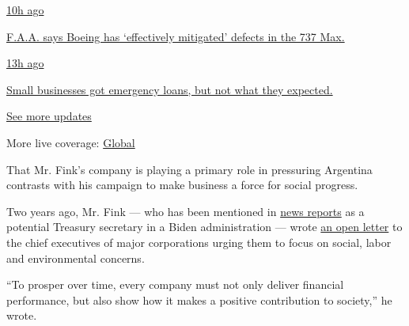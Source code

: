 \href{https://www.nytimes.com/live/2020/08/03/business/stock-market-today-coronavirus?action=click\&pgtype=Article\&state=default\&region=MAIN_CONTENT_1\&context=storylines_live_updates\#faa-says-boeing-has-effectively-mitigated-defects-in-the-737-max}{10h
ago}

\href{https://www.nytimes.com/live/2020/08/03/business/stock-market-today-coronavirus?action=click\&pgtype=Article\&state=default\&region=MAIN_CONTENT_1\&context=storylines_live_updates\#faa-says-boeing-has-effectively-mitigated-defects-in-the-737-max}{F.A.A.
says Boeing has `effectively mitigated' defects in the 737 Max.}

\href{https://www.nytimes.com/live/2020/08/03/business/stock-market-today-coronavirus?action=click\&pgtype=Article\&state=default\&region=MAIN_CONTENT_1\&context=storylines_live_updates\#small-businesses-got-emergency-loans-but-not-what-they-expected}{13h
ago}

\href{https://www.nytimes.com/live/2020/08/03/business/stock-market-today-coronavirus?action=click\&pgtype=Article\&state=default\&region=MAIN_CONTENT_1\&context=storylines_live_updates\#small-businesses-got-emergency-loans-but-not-what-they-expected}{Small
businesses got emergency loans, but not what they expected.}

\href{https://www.nytimes.com/live/2020/08/03/business/stock-market-today-coronavirus?action=click\&pgtype=Article\&state=default\&region=MAIN_CONTENT_1\&context=storylines_live_updates}{See
more updates}

More live coverage:
\href{https://www.nytimes.com/2020/08/03/world/coronavirus-covid-19.html?action=click\&pgtype=Article\&state=default\&region=MAIN_CONTENT_1\&context=storylines_live_updates}{Global}

That Mr. Fink's company is playing a primary role in pressuring
Argentina contrasts with his campaign to make business a force for
social progress.

Two years ago, Mr. Fink --- who has been mentioned in
\href{https://www.cnbc.com/2020/04/06/biden-donors-float-elizabeth-warren-larry-fink-others-for-key-roles.html}{news
reports} as a potential Treasury secretary in a Biden administration ---
wrote
\href{http://www.corporance.es/wp-content/uploads/2018/01/Larry-Fink-letter-to-CEOs-2018-1.pdf}{an
open letter} to the chief executives of major corporations urging them
to focus on social, labor and environmental concerns.

``To prosper over time, every company must not only deliver financial
performance, but also show how it makes a positive contribution to
society,'' he wrote.

